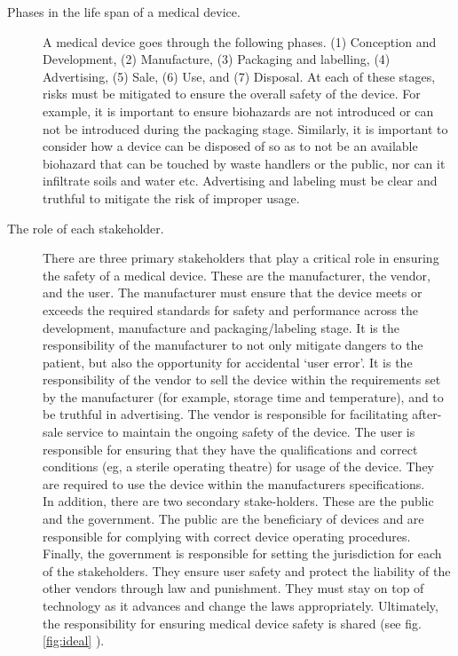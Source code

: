 \documentclass[12pt, openany, oneside]{book}
\begin{document}
\begin{description}
	\item[Phases in the life span of a medical device.] A medical device goes through the following phases. (1) Conception and Development, (2) Manufacture, (3) Packaging and labelling, (4) Advertising, (5) Sale, (6) Use, and (7) Disposal. At each of these stages, risks must be mitigated to ensure the overall safety of the device. For example, it is important to ensure biohazards are not introduced or can not be introduced during the packaging stage. Similarly, it is important to consider how a device can be disposed of so as to not be an available biohazard that can be touched by waste handlers or the public, nor can it infiltrate soils and water etc. Advertising and labeling must be clear and truthful to mitigate the risk of improper usage. 	
	\item[The role of each stakeholder.] There are three primary stakeholders that play a critical role in ensuring the safety of a medical device. These are the manufacturer, the vendor, and the user. The manufacturer must ensure that the device meets or exceeds the required standards for safety and performance across the development, manufacture and packaging/labeling stage.  It is the responsibility of the manufacturer to not only mitigate dangers to the patient, but also the opportunity for accidental `user error'. It is the responsibility of the vendor to sell the device within the requirements set by the manufacturer (for example, storage time and temperature), and to be truthful in advertising. The vendor is responsible for facilitating after-sale service to maintain the ongoing safety of the device. The user is responsible for ensuring that they have the qualifications and correct conditions (eg, a sterile operating theatre) for usage of the device. They are required to use the device within the manufacturers specifications. \\

In addition, there are two secondary stake-holders. These are the public and the government. The public are the beneficiary of devices and are responsible for complying with correct device operating procedures. Finally, the government is responsible for setting the jurisdiction for each of the stakeholders. They ensure user safety and protect the liability of the other vendors through law and punishment. They must stay on top of technology as it advances and change the laws appropriately. Ultimately, the responsibility for ensuring medical device safety is shared (see fig. \ref{fig:ideal}  \citep{cheng2003}).

\end{description}
\end{document}
